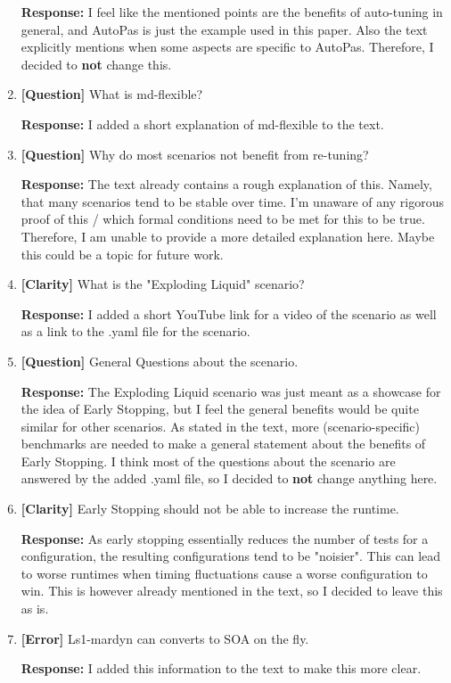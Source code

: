 \documentclass[12pt,a4paper]{article}
\begin{document}
\begin{enumerate}[label=\textbf{Comment \arabic*:}, itemsep=0.8em]
            \textbf{Response:} I feel like the mentioned points are the benefits of auto-tuning in general, and AutoPas is just the example used in this paper. Also the text explicitly mentions when some aspects are specific to AutoPas. Therefore, I decided to \textbf{not} change this.

      \item \textbf{[Question]} What is md-flexible?

            \textbf{Response:} I added a short explanation of md-flexible to the text.

      \item \textbf{[Question]} Why do most scenarios not benefit from re-tuning?

            \textbf{Response:} The text already contains a rough explanation of this. Namely, that many scenarios tend to be stable over time. I'm unaware of any rigorous proof of this / which formal conditions need to be met for this to be true. Therefore, I am unable to provide a more detailed explanation here. Maybe this could be a topic for future work.

      \item \textbf{[Clarity]} What is the "Exploding Liquid" scenario?

            \textbf{Response:} I added a short YouTube link for a video of the scenario as well as a link to the .yaml file for the scenario.

      \item \textbf{[Question]} General Questions about the scenario.

            \textbf{Response:}
            The Exploding Liquid scenario was just meant as a showcase for the idea of Early Stopping, but I feel the general benefits would be quite similar for other scenarios. As stated in the text, more (scenario-specific) benchmarks are needed to make a general statement about the benefits of Early Stopping.
            I think most of the questions about the scenario are answered by the added .yaml file, so I decided to \textbf{not} change anything here.

      \item \textbf{[Clarity]} Early Stopping should not be able to increase the runtime.

            \textbf{Response:} As early stopping essentially reduces the number of tests for a configuration, the resulting configurations tend to be "noisier". This can lead to worse runtimes when timing fluctuations cause a worse configuration to win. This is however already mentioned in the text, so I decided to leave this as is.

      \item \textbf{[Error]} Ls1-mardyn can converts to SOA on the fly.

            \textbf{Response:} I added this information to the text to make this more clear.



\end{enumerate}
\end{document}
